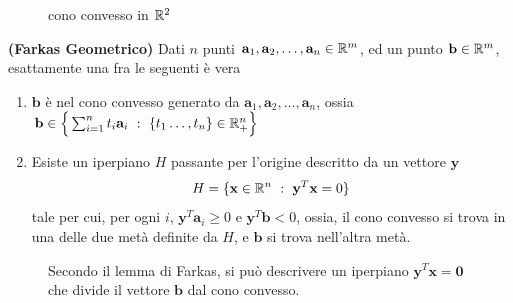\documentclass[10pt, letterpaper]{report}
\newcommand{\bb}{{\mathbf{b}}}
\newcommand{\x}{{\mathbf{x}}}
\newcommand{\y}{{\mathbf{y}}}
\begin{document}
\begin{figure}[h]
    \caption{cono convesso in ${\mathbb R}^2$}
\end{figure}

\begin{lemma2}\label{Farkas_geometrico}
    \textbf{(Farkas Geometrico)} Dati $n$ punti $\mathbf a_1,\mathbf a_2,\dots, \mathbf a_n \in {\mathbb R}^m$, ed un punto $\bb\in\R^m$, esattamente una fra le seguenti è vera\begin{enumerate}
        \item $\bb$ è nel cono convesso generato da $\mathbf a_1,\mathbf a_2,\dots, \mathbf a_n$, ossia $\bb\in \Big\{\sum_{i=1}^n t_i\mathbf a_i \ : \ \{t_1\dots,t_n\}\in\R^n_+\Big\}$
        \item Esiste un iperpiano $H$ passante per l'origine descritto da un vettore $\y$ $$ H=\{\x\in\R^n \ : \ \y^T\x=0\}$$
        tale per cui, per ogni $i$, $\y^T\mathbf a_i \ge 0$ e $\y^T\bb<0$, ossia, il cono convesso si trova in una delle due metà definite da $H$, e $\bb$ si trova nell'altra metà.
    \end{enumerate}
\end{lemma2}

\begin{figure}[h]
    \caption{Secondo il lemma di Farkas, si può descrivere un iperpiano $\y^T\x=\mathbf 0$ che divide il vettore $\bb$ dal cono convesso.}
\end{figure}
\end{document}
